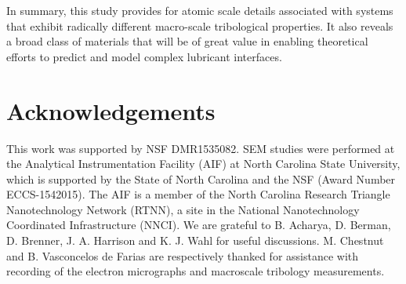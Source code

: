 In summary, this study provides for atomic scale details associated with systems that exhibit radically different macro-scale tribological properties. It also reveals a broad class of materials that will be of great value in enabling theoretical efforts to predict and model complex lubricant interfaces.

\section{Acknowledgements}

This work was supported by NSF DMR1535082. SEM studies were performed at the Analytical Instrumentation Facility (AIF) at North Carolina State University, which is supported by the State of North Carolina and the NSF (Award Number ECCS-1542015). The AIF is a member of the North Carolina Research Triangle Nanotechnology Network (RTNN), a site in the National Nanotechnology Coordinated Infrastructure (NNCI). We are grateful to B. Acharya, D. Berman, D. Brenner, J. A. Harrison and K. J. Wahl for useful discussions. M. Chestnut and B. Vasconcelos de Farias are respectively thanked for assistance with recording of the electron micrographs and macroscale tribology measurements.


